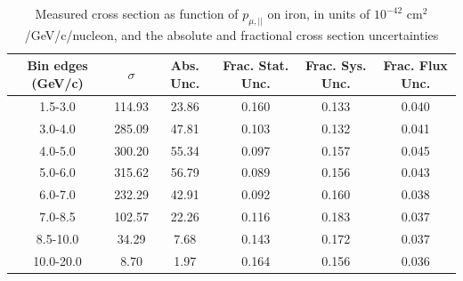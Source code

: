 \documentclass[../main.tex]{subfiles}
\begin{document}
\pagebreak
\begin{turnpage}
\end{turnpage}
\begin{table}
  \centering
  \renewcommand{\arraystretch}{1.15}
  \caption{Measured cross section as function of $p_{\mu,||}$ on iron, in units of $10^{-42}$ $\text{cm}^2$/GeV/c/nucleon, and the absolute and fractional cross section uncertainties}
    \begin{tabular}{c||c|c||c|c|c}
      Bin edges (GeV/c) &  $\sigma$  &  Abs. Unc.  &  Frac. Stat. Unc.  &  Frac. Sys. Unc.  &  Frac. Flux Unc. \\
      \hline
      \hline
      1.5-3.0 & 114.93 & 23.86 & 0.160 & 0.133 & 0.040\\
      3.0-4.0 & 285.09 & 47.81 & 0.103 & 0.132 & 0.041\\
      4.0-5.0 & 300.20 & 55.34 & 0.097 & 0.157 & 0.045\\
      5.0-6.0 & 315.62 & 56.79 & 0.089 & 0.156 & 0.043\\
      6.0-7.0 & 232.29 & 42.91 & 0.092 & 0.160 & 0.038\\
      7.0-8.5 & 102.57 & 22.26 & 0.116 & 0.183 & 0.037\\
      8.5-10.0 & 34.29 & 7.68 & 0.143 & 0.172 & 0.037\\
      10.0-20.0 & 8.70 & 1.97 & 0.164 & 0.156 & 0.036
    \end{tabular}
  \label{tbl:datanucleonnuc26muon_pza}
\end{table}
\begin{table}
  \centering
  \renewcommand{\arraystretch}{1.15}
  \caption{Statistical covariance matrix of measured cross section as function of $p_{\mu,||}$ on iron, in units of $10^{-84}$ $(\text{cm}^2$/GeV/c/nucleon$)^2$}
  \label{tbl:statnucleonnuc26muon_pzb}
\end{table}
\end{document}

